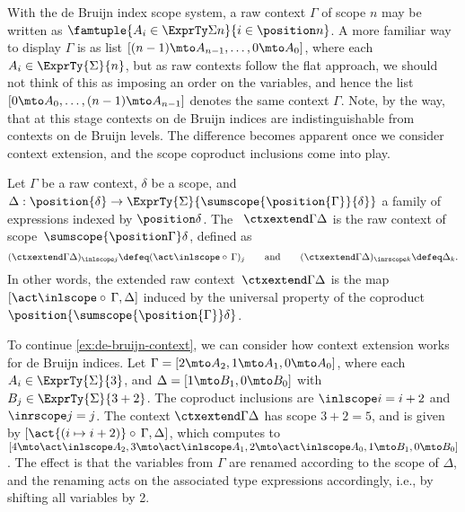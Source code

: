 \begin{example}%
  \label{ex:de-bruijn-context}
  With the de Bruijn index scope system, a raw context $\Gamma$ of scope $n$ may be written as
  $\famtuple{A_i \in \ExprTy \Sigma n}{i \in \position n}$. A more familiar way to display $\Gamma$ is as list $[(n-1) \mto A_{n-1}, \ldots, 0 \mto A_0]$, where each $A_i \in \ExprTy{\Sigma}{n}$, but as raw contexts follow the flat approach, we should not think of this as imposing an order on the variables, and hence the list $[0 \mto A_0, \ldots, (n-1) \mto A_{n-1}]$ denotes the same context $\Gamma$.
  Note, by the way, that at this stage contexts on de Bruijn indices are indistinguishable from contexts on de Bruijn levels.
  The difference becomes apparent once we consider context extension, and the scope coproduct inclusions come into play.
\end{example}

\begin{definition}%
  \label{def:context-extension}%
  Let $\Gamma$ be a raw context, $\delta$ be a scope, and $\Delta : \position{\delta} \to \ExprTy{\Sigma}{\sumscope {\position{\Gamma}} {\delta}}$ a family of expressions indexed by $\position \delta$.
  The ~$\ctxextend \Gamma \Delta$ is the raw context of scope~$\sumscope {\position \Gamma} \delta$, defined as
  \begin{equation*}
    (\ctxextend \Gamma \Delta)_{\inlscope j} \defeq (\act \inlscope \circ\, \Gamma)_j
    \qquad\text{and}\qquad
    (\ctxextend \Gamma \Delta)_{\inrscope k} \defeq \Delta_k.
  \end{equation*}
  In other words, the extended raw context~$\ctxextend \Gamma \Delta$ is the map $[\act \inlscope \circ\, \Gamma, \Delta]$ induced by the universal property of the coproduct~$\position{\sumscope {\position{\Gamma}} \delta}$.
\end{definition}

\begin{example}
To continue \cref{ex:de-bruijn-context}, we can consider how context extension works for de Bruijn indices. Let $\Gamma = [2 \mto A_2, 1 \mto A_1, 0 \mto A_0]$, where each $A_i \in \ExprTy{\Sigma}{3}$, and $\Delta = [1 \mto B_1, 0 \mto B_0]$ with $B_j \in \ExprTy{\Sigma}{3 + 2}$. The coproduct inclusions are $\inlscope i = i + 2$ and $\inrscope j = j$. The context $\ctxextend \Gamma \Delta$ has scope $3 + 2 = 5$, and is given by $[\act {(i \mapsto i + 2)} \circ\, \Gamma, \Delta]$, which computes to $[4 \mto \act \inlscope A_2, 3 \mto \act \inlscope A_1, 2 \mto \act \inlscope A_0, 1 \mto B_1, 0 \mto B_0]$. The effect is that the variables from $\Gamma$ are renamed according to the scope of $\Delta$, and the renaming acts on the associated type expressions accordingly, i.e., by shifting all variables by 2.
\end{example}


